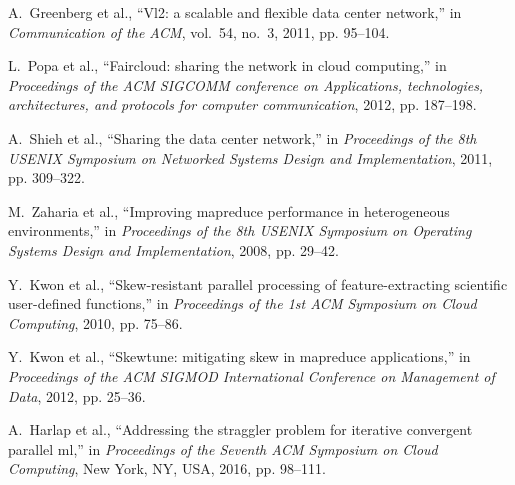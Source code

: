 \documentclass[10pt,journal,compsoc]{IEEEtran}
\begin{document}
\begin{thebibliography}{43}
A.~Greenberg et al., ``Vl2: a scalable and flexible data center
  network,'' in \emph{Communication of the ACM}, vol.~54, no.~3, 2011, pp.
  95--104.

L.~Popa et al.,
  ``Faircloud: sharing the network in cloud computing,'' in \emph{Proceedings
  of the ACM SIGCOMM conference on Applications, technologies, architectures,
  and protocols for computer communication}, 2012, pp. 187--198.

A.~Shieh et al., ``Sharing the data
  center network,'' in \emph{Proceedings of the 8th USENIX Symposium on
  Networked Systems Design and Implementation}, 2011, pp. 309--322.

M.~Zaharia et al., ``Improving
  mapreduce performance in heterogeneous environments,'' in \emph{Proceedings
  of the 8th USENIX Symposium on Operating Systems Design and Implementation},
  2008, pp. 29--42.

Y.~Kwon et al., ``Skew-resistant parallel
  processing of feature-extracting scientific user-defined functions,'' in
  \emph{Proceedings of the 1st ACM Symposium on Cloud Computing}, 2010, pp. 75--86.

Y.~Kwon et al., ``Skewtune: mitigating skew in mapreduce applications,'' in
  \emph{Proceedings of the ACM SIGMOD International Conference on Management of
  Data}, 2012, pp. 25--36.

A.~Harlap et al., ``Addressing the straggler problem for iterative convergent
  parallel ml,'' in \emph{Proceedings of the Seventh ACM Symposium on Cloud
  Computing}, New York, NY, USA, 2016, pp. 98--111.


\end{thebibliography}

%
%

% 
\end{document}
